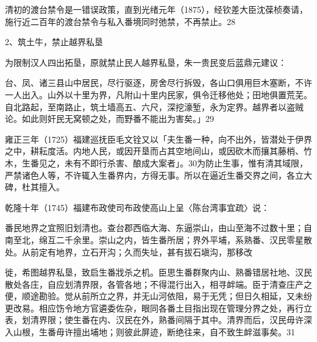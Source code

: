 清初的渡台禁令是一错误政策，直到光绪元年（1875），经钦差大臣沈葆桢奏请，施行近二百年的渡台禁令与私入番境同时弛禁，不再禁止。28

2、筑土牛，禁止越界私垦

为限制汉人四出拓垦，原就禁止民人越界私垦，朱一贵民变后蓝鼎元建议：

\begin{BookQuote}
台、凤、诸三县山中居民，尽行驱逐，房舍尽行拆毁，各山口俱用巨木塞断，不许一人出入。山外以十里为界，凡附山十里内民家，俱令迁移他处；田地俱置荒芜。自北路起，至南路止，筑土墙高五、六尺，深挖濠堑，永为定界。越界者以盗贼论。如此则奸民无窝顿之处，而野番不能出为害矣。」29
\end{BookQuote}

雍正三年（1725）福建巡抚臣毛文铨又以「夫生番一种，向不出外，皆潜处于伊界之中，耕耘度活。内地人民，或因开垦而占其空地间山，或因砍木而攘其藤梢、竹木，生番见之，未有不即行杀害、酿成大案者」。30为防止生事，惟有清其域限，严禁诸色人等，不许辄入生番界内，方得无事。所以在逼近生番交界之间，各立大碑，杜其擅入。

乾隆十年（1745）福建布政使司布政使高山上呈〈陈台湾事宜疏〉说：

\begin{BookQuote}
番民地界之宜照旧划清也。查台郡西临大海、东逼崇山，由山至海不过数十里；自南至北，绵互二千余里。崇山之内，皆生番所居；界外平埔，系熟番、汉民零星散处。从前定有地界，立石开沟；久而失址，甚有拔石塡沟，那移改
\end{BookQuote}

\vfill
\begin{BookNotes}
\end{BookNotes}

\begin{BookQuote}
徙，希图越界私垦，致启生番戕杀之机。臣思生番群聚内山、熟番错居社地、汉民散处各庄，自应划清界限，各管各地；不得混行出入，相寻衅端。臣于清查庄产之便，顺途勘验。觉从前所立之界，并无山河依阻，易于无凭；但日久相延，又未纷更改易。相应饬令地方官遴委佐杂，眼同各番土目指出现在管理分界之处，再行立表，划清界限；使生番在内、汉民在外，熟番间隔于其中。清界而后，汉民毋许深入山根，生番毋许擅出埔地；则彼此屏迹，断绝往来，自不致生衅滋事矣。31
\end{BookQuote}

